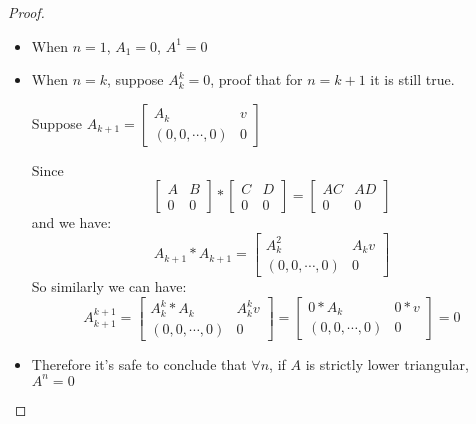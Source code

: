 \documentclass{article}
\begin{document}
\begin{description}
\begin{proof}
		      \begin{itemize}
			      \item When $n = 1$, $A_1 = 0$, $A^1 = 0$
			      \item When $n = k$, suppose $A_k^k = 0$, proof that for $n = k+1$ it is still true.

			            Suppose $A_{k+1} = \begin{bmatrix}
					            A_k               & \textit{v} \\
					            (0, 0, \cdots, 0) & 0
				            \end{bmatrix}	$

			            Since
			            $$\begin{bmatrix}
					            A & B \\
					            0 & 0
				            \end{bmatrix} * \begin{bmatrix}
					            C & D \\
					            0 & 0
				            \end{bmatrix} = \begin{bmatrix}
					            AC & AD \\
					            0  & 0
				            \end{bmatrix}
			            $$
			            and we have:
			            $$A_{k+1} * A_{k+1} = \begin{bmatrix}
					            A_k^2             & A_k\textit{v} \\
					            (0, 0, \cdots, 0) & 0
				            \end{bmatrix}	$$
			            So similarly we can have:
			            $$A_{k+1}^{k+1} = \begin{bmatrix}
					            A_k^k * A_k       & A_k^k\textit{v} \\
					            (0, 0, \cdots, 0) & 0
				            \end{bmatrix} = \begin{bmatrix}
					            0 * A_k           & 0 * \textit{v} \\
					            (0, 0, \cdots, 0) & 0
				            \end{bmatrix} = 0	$$
			      \item Therefore it's safe to conclude that $\forall n$, if $A$ is strictly lower triangular, $A^n = 0$
		      \end{itemize}
	      \end{proof}



\end{description}
\end{document}
